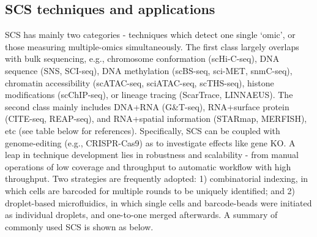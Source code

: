 \subsection{SCS techniques and applications}

SCS has mainly two categories - techniques which detect one single `omic', or those measuring multiple-omics simultaneously. The first class largely overlaps with bulk sequencing, e.g., chromosome conformation (scHi-C-seq), DNA sequence (SNS, SCI-seq), DNA methylation (scBS-seq, sci-MET, snmC-seq), chromatin accessibility (scATAC-seq, sciATAC-seq, scTHS-seq), histone modifications (scChIP-seq), or lineage tracing (ScarTrace, LINNAEUS). The second class mainly includes DNA+RNA (G\&T-seq), RNA+surface protein (CITE-seq, REAP-seq), and RNA+spatial information (STARmap, MERFISH), etc (see table below for references). Specifically, SCS can be coupled with genome-editing (e.g., CRISPR-Cas9) as to investigate effects like gene KO. A leap in technique development lies in robustness and scalability - from manual operations of low coverage and throughput to automatic workflow with high throughput. Two strategies are frequently adopted: 1) combinatorial indexing, in which cells are barcoded for multiple rounds to be uniquely identified; and 2) droplet-based microfluidics, in which single cells and barcode-beads were initiated as individual droplets, and one-to-one merged afterwards. A summary of commonly used SCS is shown as below.

